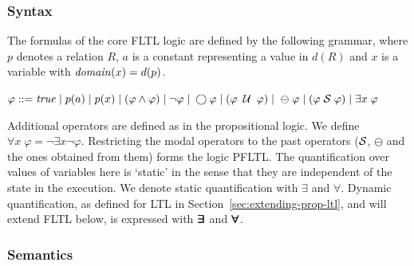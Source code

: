 

\subsubsection{Syntax} 

The formulas of the core FLTL logic are 
defined by the following grammar,
where $p$ denotes a relation $R$,
$a$ is a constant representing a value in $d ( R )$ and $x$ is a variable with $\mathit{domain} ( x ) = d ( p )$.
\begin{center}
$\varphi ::= \mathit{true}  \; | \;
    p ( a ) \; | \;
    p ( x ) \; | \;
    ( \varphi \wedge \varphi ) \;  |   \;
   \neg \varphi \; | \;
   \bigcirc \varphi \; | \; 
   ( \varphi \; \mathbin{\mathcal{U}} \; \varphi ) \; | $ %
   $ \ominus \; \varphi \; | \;
    ( \varphi  \; {\cal S}  \; \varphi ) \; | \;
    \exists x \; \varphi$
\end{center}


\noindent 

Additional operators are defined as in the propositional logic. We define
$\forall x \; \varphi = \neg \exists x \neg \varphi$.
Restricting the modal operators to the past operators
(${\cal S}$, $\ominus$ and the ones obtained from them) 
forms the logic PFLTL.
The quantification over values of variables here is `static' in the sense that they are independent of the state in the execution. We
denote static quantification with $\exists$ and
$\forall$.
Dynamic quantification, as defined for LTL in Section~\ref{sec:extending-prop-ltl},
and will extend FLTL below, is expressed with $\bm{\exists}\kern-0.6em\bm{\exists}$ and $\bm{\forall}\kern-0.6em\bm{\forall}$.

\subsubsection{Semantics} 


